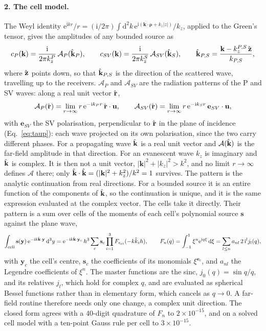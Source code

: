 \documentclass[11pt,a4paper]{article}
\newcommand{\bu}{\mathbf{u}}
\newcommand{\dd}{\mathrm{d}}
\newcommand{\uvec}[1]{{\hat{\mathbf{#1}\mkern-3mu}\mkern3mu}}
\newcommand{\uhat}[1]{{\hat{#1\mkern-2mu}\mkern2mu}}
\begin{document}
\paragraph{2. The cell model.} The Weyl identity
$\mathrm e^{\mathrm ikr}/r=(\mathrm i/2\pi)\int\dd^2k\,\mathrm e^{\mathrm i(\mathbf k\cdot\boldsymbol\rho+k_z|z|)}/k_z$,
applied to the Green's tensor, gives the amplitudes of any bounded source as
\begin{equation}\label{eq:weylamp}
  c_P(\mathbf k)=\frac{\mathrm i}{2\pi k_z^P}\,\mathcal A_P(\uvec{k}_P),\qquad
  c_{SV}(\mathbf k)=\frac{\mathrm i}{2\pi k_z^S}\,\mathcal A_{SV}(\uvec{k}_S),\qquad
  \uvec{k}_{P,S}=\frac{\mathbf k-k_z^{P,S}\,\uvec{z}}{k_{P,S}},
\end{equation}
where $\uvec{z}$ points down, so that $\uvec{k}_{P,S}$ is the direction of the scattered wave,
travelling up to the receivers. $\mathcal A_P$ and
$\mathcal A_{SV}$ are the radiation patterns of the P and SV waves: along a real unit vector $\uvec{r}$,
\[
  \mathcal A_P(\uvec{r})=\lim_{r\to\infty}r\,\mathrm e^{-\mathrm ik_Pr}\,\uvec{r}\cdot\bu,\qquad
  \mathcal A_{SV}(\uvec{r})=\lim_{r\to\infty}r\,\mathrm e^{-\mathrm ik_Sr}\,\mathbf e_{SV}\cdot\bu,
\]
with $\mathbf e_{SV}$ the SV polarisation, perpendicular to $\uvec{r}$ in the plane of incidence
(Eq.~\eqref{eq:taup}): each wave projected on its own polarisation, since the two carry different phases. For a propagating wave
$\uvec{k}$ is a real unit vector and $\mathcal A(\uvec{k})$ is the far-field amplitude in that direction. For an
evanescent wave $k_z$ is imaginary and $\uvec{k}$ is complex. It is then not a unit vector,
$|\mathbf k|^2+|k_z|^2>k^2$, and no limit $r\to\infty$ defines $\mathcal A$ there; only
$\uvec{k}\cdot\uvec{k}=(|\mathbf k|^2+k_z^2)/k^2=1$ survives. The pattern is the analytic continuation from
real directions. For a bounded source it is an entire function of the components of $\uvec{k}$, so the
continuation is unique, and it is the same expression evaluated at the complex vector. The cells take it
directly. Their pattern is a sum over cells of the moments of each
cell's polynomial source $\mathbf s$ against the plane wave,
\begin{equation}\label{eq:cellmoment}
  \int_{\text{cell}}\mathbf s(\mathbf y)\,\mathrm e^{-\mathrm ik\uvec{k}\cdot\mathbf y}\,\dd^3y
  =\mathrm e^{-\mathrm ik\uvec{k}\cdot\mathbf y_c}\,h^3\sum_c\mathbf s_c\prod_{i=1}^3F_{e_{ci}}(-k\uhat{k}_ih),\qquad
  F_n(q)=\int_{-1}^1\xi^n\mathrm e^{\mathrm iq\xi}\,\dd\xi=\sum_{l\le n}a_{nl}\,2\,\mathrm i^l j_l(q),
\end{equation}
with $\mathbf y_c$ the cell's centre, $\mathbf s_c$ the coefficients of its monomials $\xi^{\mathbf e_c}$, and
$a_{nl}$ the Legendre coefficients of $\xi^n$. The master functions are the sinc, $j_0(q)=\sin q/q$, and its
relatives $j_l$, which hold for complex $q$, and are evaluated as spherical Bessel functions rather than in
elementary form, which cancels as $q\to0$. A far-field routine therefore needs only one change, a complex
unit direction. The closed form agrees
with a $40$-digit quadrature of $F_n$ to $2\times10^{-15}$, and on a solved cell model with a ten-point Gauss
rule per cell to $3\times10^{-15}$.
\end{document}
